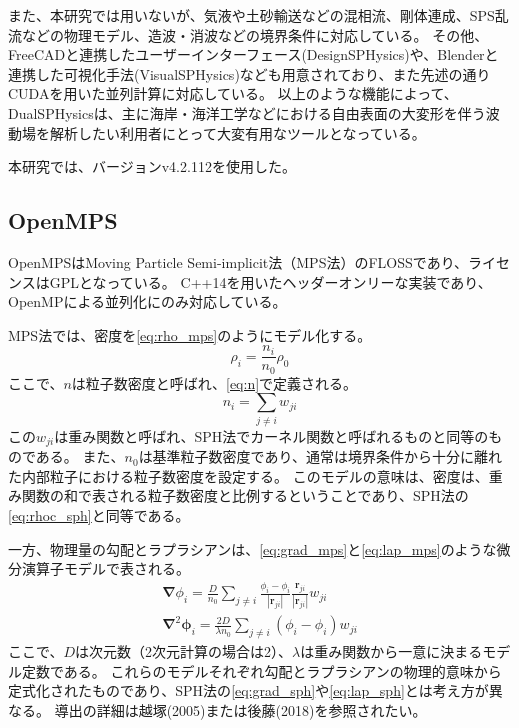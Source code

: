 		また、本研究では用いないが、気液や土砂輸送などの混相流、剛体連成、SPS乱流などの物理モデル、造波・消波などの境界条件に対応している。
		その他、FreeCADと連携したユーザーインターフェース(DesignSPHysics)や、Blenderと連携した可視化手法(VisualSPHysics)なども用意されており、また先述の通りCUDAを用いた並列計算に対応している。
		以上のような機能によって、DualSPHysicsは、主に海岸・海洋工学などにおける自由表面の大変形を伴う波動場を解析したい利用者にとって大変有用なツールとなっている。

		本研究では、バージョンv4.2.112を使用した。

	\subsection{OpenMPS}
		OpenMPS\Cite{ref:openmps}はMoving Particle Semi-implicit法（MPS法）\Cite{ref:mps}のFLOSSであり、ライセンスはGPLとなっている。
		C++14を用いたヘッダーオンリーな実装であり、OpenMPによる並列化にのみ対応している。

		MPS法では、密度を\cref{eq:rho_mps}のようにモデル化する。
		\begin{equation}
			\rho_i = \frac{n_i}{n_0} \rho_0 \label{eq:rho_mps}
		\end{equation}
		ここで、$n$は粒子数密度と呼ばれ、\cref{eq:n}で定義される。
		\begin{equation}
			n_i = \sum_{j \neq i} w_{ji} \label{eq:n}
		\end{equation}
		この$w_{ji}$は重み関数と呼ばれ、SPH法でカーネル関数と呼ばれるものと同等のものである。
		また、$n_0$は基準粒子数密度であり、通常は境界条件から十分に離れた内部粒子における粒子数密度を設定する。
		このモデルの意味は、密度は、重み関数の和で表される粒子数密度と比例するということであり、SPH法の\cref{eq:rhoc_sph}と同等である。

		一方、物理量の勾配とラプラシアンは、\cref{eq:grad_mps}と\cref{eq:lap_mps}のような微分演算子モデルで表される。
		\begin{gather}
			\mathbf{\nabla} \phi_i = \frac{D}{n_0} \sum_{j \neq i} \frac{\phi_i - \phi_i}{\left| \mathbf{r}_{ji} \right|} \frac{\mathbf{r}_{ji}}{\left| \mathbf{r}_{ji} \right|} w_{ji} \label{eq:grad_mps} \\
			\mathbf{\nabla}^2 \mathbf{\phi}_i = \frac{2D}{\lambda n_0} \sum_{j \neq i} \left( \phi_i - \phi_i \right) w_{ji} \label{eq:lap_mps}
		\end{gather}
		ここで、$D$は次元数（2次元計算の場合は2）、$\lambda$は重み関数から一意に決まるモデル定数である。
		これらのモデルそれぞれ勾配とラプラシアンの物理的意味から定式化されたものであり、SPH法の\cref{eq:grad_sph}や\cref{eq:lap_sph}とは考え方が異なる。
		導出の詳細は越塚(2005)\Cite{ref:koshizuka2005}または後藤(2018)\Cite{ref:gotoh2018}を参照されたい。

